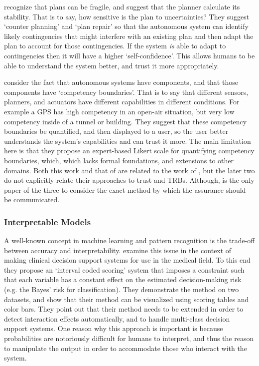     \citet{Kuter2015-qh} recognize that plans can be fragile, and suggest that the planner calculate its stability. That is to say, how sensitive is the plan to uncertainties? They suggest `counter planning' and `plan repair' so that the autonomous system can identify likely contingencies that might interfere with an existing plan and then adapt the plan to account for those contingencies. If the system \emph{is} able to adapt to contingencies then it will have a higher `self-confidence'. This allows humans to be able to understand the system better, and trust it more appropriately.

    \citet{Hutchins2015-if} consider the fact that autonomous systems have components, and that those components have `competency boundaries'. That is to say that different sensors, planners, and actuators have different capabilities in different conditions. For example a GPS has high competency in an open-air situation, but very low competency inside of a tunnel or building. They suggest that these competency boundaries be quantified, and then displayed to a user, so the user better understands the system's capabilities and can trust it more. The main limitation here is that they propose an expert-based Likert scale for quantifying competency boundaries, which, which  lacks formal foundations, and extensions to other domains. Both this work and that of \citeauthor{Kuter2015-qh} are related to the work of \citeauthor{Aitken2016-fb}, but the later two do not explicitly relate their approaches to trust and TRBs. Although, \citeauthor{Hutchins2015-if} is the only paper of the three to consider the exact method by which the assurance should be communicated.

\subsubsection{Interpretable Models} \label{sec:model_interp}
    A well-known concept in machine learning and pattern recognition is the trade-off between accuracy and interpretability. \citet{Van_Belle2012-dt} examine this issue in the context of making clinical decision support systems for use in the medical field. To this end they propose an `interval coded scoring' system that imposes a constraint such that each variable has a constant effect on the estimated decision-making risk (e.g. the Bayes' risk for classification).  They demonstrate the method on two datasets, and show that their method can be visualized using scoring tables and color bars. They point out that their method needs to be extended in order to detect interaction effects automatically, and to handle multi-class decision support systems. One reason why this approach is important is because probabilities are notoriously difficult for humans to interpret, and thus the reason to manipulate the output in order to accommodate those who interact with the system.

